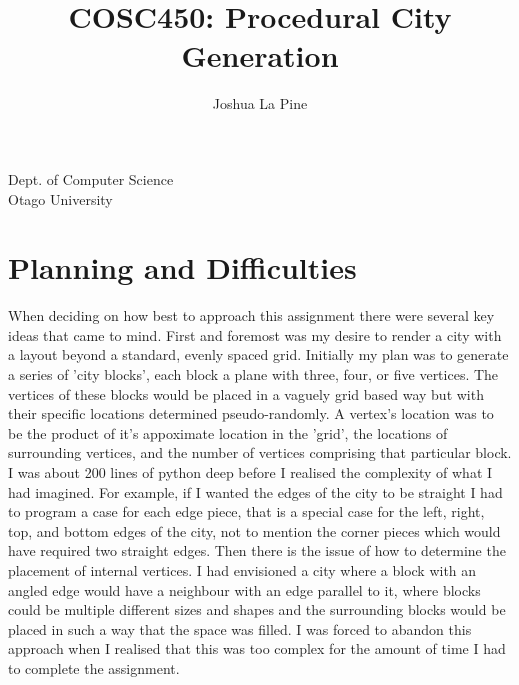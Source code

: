 \documentclass{article}
\title{COSC450: Procedural City Generation} %
\author{Joshua La Pine} %
\begin{document}
\maketitle %

\begin{center}
Dept. of Computer Science \\
Otago University \\

\end{center}
\newpage


\section{Planning and Difficulties}

When deciding on how best to approach this assignment there were several key ideas that came to mind. First and foremost was my desire to render a city with a layout beyond a standard, evenly spaced grid. Initially my plan was to generate a series of 'city blocks', each block a plane with three, four, or five vertices. The vertices of these blocks would be placed in a vaguely grid based way but with their specific locations determined pseudo-randomly. A vertex's location was to be the product of it's appoximate location in the 'grid', the locations of surrounding vertices, and the number of vertices comprising that particular block. I was about 200 lines of python deep before I realised the complexity of what I had imagined. For example, if I wanted the edges of the city to be straight I had to program a case for each edge piece, that is a special case for the left, right, top, and bottom edges of the city, not to mention the corner pieces which would have required two straight edges. Then there is the issue of how to determine the placement of internal vertices. I had envisioned a city where a block with an angled edge would have a neighbour with an edge parallel to it, where blocks could be multiple different sizes and shapes and the surrounding blocks would be placed in such a way that the space was filled. I was forced to abandon this approach when I realised that this was too complex for the amount of time I had to complete the assignment. \par
\end{document}
